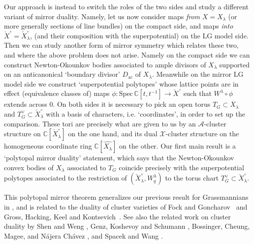 \documentclass{amsart}
\theoremstyle{definition}
\numberwithin{equation}{section}
\newcommand{\Spec}{\mathrm{Spec}}
\newcommand{\C}{\mathbb{C}}
\newcommand{\inv}{^{-1}}
\newcommand{\ac}{\operatorname{ac}}
\begin{document}
Our approach is instead to switch the roles of the two sides and study a different variant of mirror duality. Namely, let us now consider maps {\it from} $X=X_\lambda$ (or more generally sections of line bundles) on the compact side, and maps {\it into}  $\check X^\circ=\check X^\circ_\lambda$, (and their composition with the superpotential) on  
the LG model side.
Then we can study another form of mirror symmetry which relates these two, and where the above problem does not arise.  Namely on the compact side we can construct Newton-Okounkov bodies associated to ample divisors of $X_\lambda$ supported on an anticanonical `boundary divisor'  $D_{\ac}$ of $X_\lambda$. Meanwhile on the mirror LG model side we construct `superpotential polytopes' whose lattice points are in effect (equivalence classes of) maps $\phi:\Spec\, \C[t,t\inv]\to \check X^\circ$ such that $W^\lambda\circ\phi$ extends across $0$. On both sides it is necessary to pick an open torus $T_G\subset X_\lambda$ and $T^\vee_G\subset \check X_\lambda^\circ$ with a basis of characters, i.e. `coordinates', in order to set up the comparison. These tori are precisely what are given to us by an $\mathcal A$-cluster structure on $\C[\check X^\circ_\lambda]$ on the one hand, and its dual $\mathcal X$-cluster structure on the homogeneous coordinate ring  $\C[\widehat{X_\lambda}]$ on the other. Our first
main result is a `polytopal mirror duality'
statement, which says that the Newton-Okounkov convex bodies of $X_\lambda$ associated to $T_G$ coincide precisely with the superpotential polytopes associated to the restriction of $(\check X_{\lambda}^\circ,W_q^\lambda)$ to the torus chart $T^\vee_G\subset \check X_\lambda^\circ$.

This polytopal mirror theorem  generalizes our previous result for Grassmannians in \cite{RW}, 
and is related to the duality of cluster varieties of Fock and Goncharov~\cite{FG1} and 
Gross, Hacking, Keel and Kontsevich~\cite{GHKK}.  
See also 
the related work on cluster duality by Shen and Weng \cite{ShenWeng}, 
Genz, Koshevoy and Schumann \cite{Schumann}, 
 Bossinger, Cheung, Magee, and N\'ajera Ch\'avez
\cite{bossinger2023newtonokounkov}, and Spacek and Wang \cite{SW1, Wang}.
\end{document}

